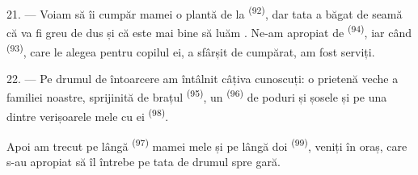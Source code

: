 21. --- Voiam să îi cumpăr mamei o plantă de la 
\textsuperscript{(92)}, dar tata a băgat de seamă că va fi greu de dus și că este
mai bine să luăm . Ne-am apropiat de 
\textsuperscript{(94)}, iar când  \textsuperscript{(93)}, care le
alegea pentru copilul ei, a sfârșit de cumpărat, am fost serviți.

22. --- Pe drumul de întoarcere am întâlnit câțiva cunoscuți: o prietenă veche a
familiei noastre, sprijinită de brațul 
\textsuperscript{(95)}, un  \textsuperscript{(96)} de poduri și
șosele și pe una dintre verișoarele mele cu  ei
\textsuperscript{(98)}.

Apoi am trecut pe lângă  \textsuperscript{(97)} mamei mele și pe
lângă doi  \textsuperscript{(99)}, veniți în oraș, care s-au
apropiat să îl întrebe pe tata de drumul spre gară.
\VUsaut{6.0mm}
\VUfilet{22mm}
